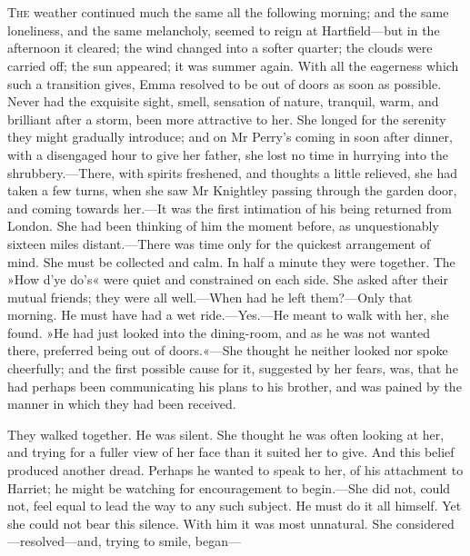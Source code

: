 \chapter[Chapter \thechapter]{}
\lettrine[lines=4,lraise=0.3]{T}{he} weather continued much the same all the following morning; and the same loneliness, and the same melancholy, seemed to reign at Hartfield—but in the afternoon it cleared; the wind changed into a softer quarter; the clouds were carried off; the sun appeared; it was summer again. With all the eagerness which such a transition gives, Emma resolved to be out of doors as soon as possible. Never had the exquisite sight, smell, sensation of nature, tranquil, warm, and brilliant after a storm, been more attractive to her. She longed for the serenity they might gradually introduce; and on Mr Perry's coming in soon after dinner, with a disengaged hour to give her father, she lost no time in hurrying into the shrubbery.—There, with spirits freshened, and thoughts a little relieved, she had taken a few turns, when she saw Mr Knightley passing through the garden door, and coming towards her.—It was the first intimation of his being returned from London. She had been thinking of him the moment before, as unquestionably sixteen miles distant.—There was time only for the quickest arrangement of mind. She must be collected and calm. In half a minute they were together. The »How d'ye do's« were quiet and constrained on each side. She asked after their mutual friends; they were all well.—When had he left them?—Only that morning. He must have had a wet ride.—Yes.—He meant to walk with her, she found. »He had just looked into the dining-room, and as he was not wanted there, preferred being out of doors.«—She thought he neither looked nor spoke cheerfully; and the first possible cause for it, suggested by her fears, was, that he had perhaps been communicating his plans to his brother, and was pained by the manner in which they had been received.

They walked together. He was silent. She thought he was often looking at her, and trying for a fuller view of her face than it suited her to give. And this belief produced another dread. Perhaps he wanted to speak to her, of his attachment to Harriet; he might be watching for encouragement to begin.—She did not, could not, feel equal to lead the way to any such subject. He must do it all himself. Yet she could not bear this silence. With him it was most unnatural. She considered—resolved—and, trying to smile, began—

